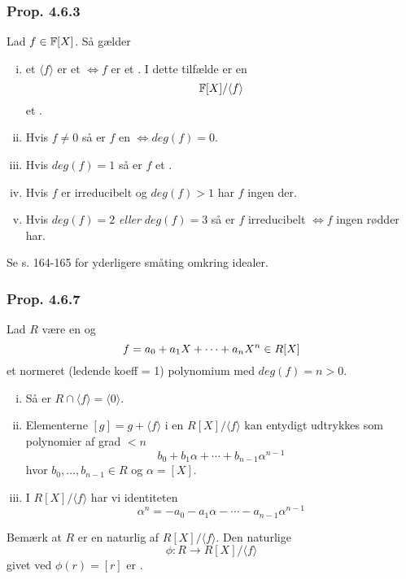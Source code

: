 \subsubsection{Prop. 4.6.3}
\label{Prop. 4.6.3}
Lad $ f \in \mathbb{F}[X]$. Så gælder
\begin{enumerate}[(i)]
  \item {}et $\langle f \rangle$ er et 
  $\iff f$ er et . I dette tilfælde er
  en
  \begin{equation*}
    \mathbb{F}[X]/\langle f \rangle
  \end{equation*}
  et .
  
  \item Hvis $f \neq 0$ så er $f$ en  $\iff deg(f) = 0$.
  \item Hvis $deg(f) = 1$ så er $f$ et .
  \item Hvis $f$ er irreducibelt og $deg(f) > 1$ har $f$ ingen
  der.
  \item Hvis $deg(f) = 2$ \textit{eller} $deg(f) = 3$ så er $f$ irreducibelt
  $\iff f$ ingen rødder har.
\end{enumerate}
Se s. 164-165 for yderligere småting omkring idealer.

\subsubsection{Prop. 4.6.7}
\label{Prop. 4.6.7}
Lad $R$ være en  og
\begin{equation*}
  f = a_0 + a_1 X + \cdots + a_n X^n \in R[X]
\end{equation*}
et normeret (ledende koeff = 1) polynomium med $deg(f) = n > 0$. 

\begin{enumerate}[(i)]
  \item Så er $R \cap \langle f \rangle = \langle 0 \rangle$.
  \item Elementerne $[g] = g + \langle f \rangle$ i en
$R[X]/\langle f \rangle$ kan entydigt udtrykkes som polynomier af grad $ < n$
\begin{equation*}
  b_0 + b_1 \alpha + \cdots + b_{n-1}\alpha^{n-1}
\end{equation*}
hvor $b_0,\ldots,b_{n-1} \in R$ og $\alpha = [X]$.
  \item I $R[X]/\langle f \rangle$ har vi identiteten
\begin{equation*}
  \alpha^n = - a_0 -a_1 \alpha - \cdots - a_{n-1}\alpha^{n-1}
\end{equation*}
\end{enumerate}
Bemærk at $R$ er en naturlig  af $R[X]/\langle f \rangle$. Den
naturlige
\begin{equation*}
  \phi: R \rightarrow R[X]/\langle f \rangle
\end{equation*}
givet ved $\phi(r) = [r]$ er .

